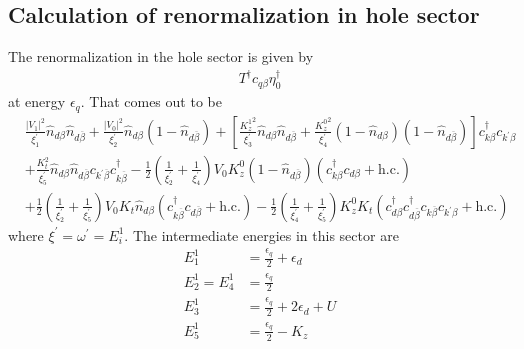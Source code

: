 \documentclass[twoside]{report}
\numberwithin{equation}{section}
\begin{document}
\subsection{Calculation of renormalization in hole sector}
The renormalization in the hole sector is given by
\begin{equation}\begin{aligned}
	T^\dagger c_{q\beta}\eta_0^\dagger
\end{aligned}\end{equation}
at energy \(\epsilon_q\). That comes out to be
\begin{equation}\begin{aligned}
&\frac{|V_1|^2}{\xi^\prime_1}\hat n_{d\beta}\hat n_{d\overline\beta} + \frac{|V_0|^2}{\xi^\prime_2}\hat n_{d\beta}\left(1 - \hat n_{d\overline\beta}\right) + \left[\frac{{K_z^1}^2}{\xi^\prime_3}\hat n_{d\beta}\hat n_{d\overline\beta} + \frac{{K_z^0}^2}{\xi^\prime_4}\left(1 - \hat n_{d\beta}\right)\left(1 - \hat n_{d\overline\beta}\right)\right]c^\dagger_{k\beta}c_{k^\prime\beta}\\
&+\frac{K_t^2}{\xi^\prime_5}\hat n_{d\beta}\hat n_{d\overline\beta}c_{k^\prime\overline\beta}c^\dagger_{k\overline\beta} - \frac{1}{2}\left(\frac{1}{\xi^\prime_2} + \frac{1}{\xi^\prime_4}\right)V_0 K_z^0\left(1 - \hat n_{d\overline\beta}\right)\left(c^\dagger_{k\beta}c_{d\beta} + \text{h.c.}\right) \\
&+ \frac{1}{2}\left(\frac{1}{\xi^\prime_2} + \frac{1}{\xi^\prime_5}\right)V_0 K_t\hat n_{d\beta}\left(c^\dagger_{k\overline\beta}c_{d\overline\beta} + \text{h.c.}\right) - \frac{1}{2}\left(\frac{1}{\xi^\prime_4} + \frac{1}{\xi^\prime_5}\right)K_z^0 K_t\left(c^\dagger_{d\beta}c^\dagger_{d\overline\beta}c_{k\overline\beta}c_{k^\prime\beta} + \text{h.c.}\right) 
\end{aligned}\end{equation}
where \(\xi^\prime = \omega^\prime = E_i^1\). The intermediate energies in this sector are
\begin{equation}\begin{aligned}
	E^1_1 &= \frac{\epsilon_q}{2} + \epsilon_d\\
	E^1_2 = E_4^1 &= \frac{\epsilon_q}{2}\\
	E^1_3 &= \frac{\epsilon_q}{2} + 2\epsilon_d + U\\
	E_5^1 &= \frac{\epsilon_q}{2} - K_z\\
\end{aligned}\end{equation}
\end{document}
